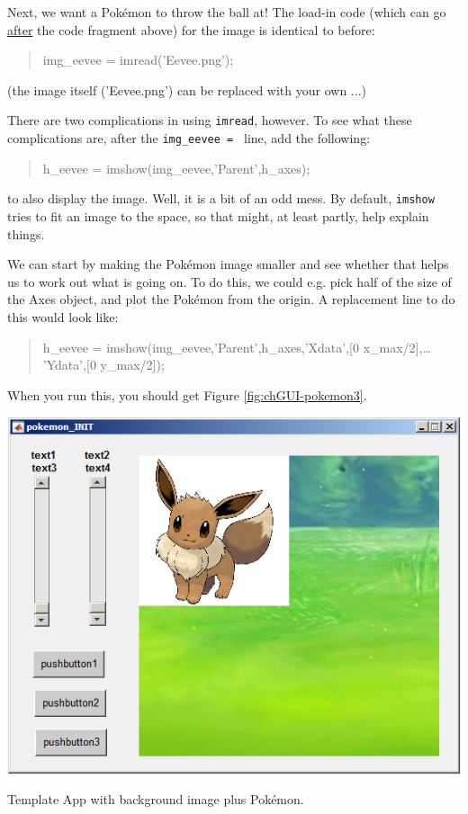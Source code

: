 \documentclass{tufte-book} %
\newenvironment{docspec}{\begin{quotation}\ttfamily\parskip0pt\parindent0pt\ignorespaces}{\end{quotation}}
\begin{document}
Next, we want a Pok\'emon to throw the ball at! The load-in code (which can go \uline{after} the code fragment above) for the image is identical to before:
\begin{docspec}
img\_eevee = imread(\textcolor[rgb]{0.501961,0,1}{'Eevee.png'});
\end{docspec}
(the image itself ('\textsf{Eevee.png}') can be replaced with your own ...) 

There are two complications in using \texttt{imread}, however. To see what these complications are, after the \texttt{img\_eevee = } line, add the following:
\begin{docspec}
h\_eevee = imshow(img\_eevee,\textcolor[rgb]{0.501961,0,1}{'Parent'},h\_axes);
\end{docspec}
to also display the image. Well, it is a bit of an odd mess. By default, \texttt{imshow} tries to fit an image to the space, so that might, at least partly, help explain things.

We can start by making the Pok\'emon image smaller and see whether that helps us to work out what is going on. To do this, we could e.g. pick half of the size of the \textsf{Axes} object, and plot the Pok\'emon from the origin. A replacement line to do this would look like: 
\begin{docspec}
h\_eevee = imshow(img\_eevee,\textcolor[rgb]{0.501961,0,1}{'Parent'},h\_axes,\textcolor[rgb]{0.501961,0,1}{'Xdata'},[0 x\_max/2],\ldots
\\\textcolor[rgb]{0.501961,0,1}{'Ydata'},[0 y\_max/2]);
\end{docspec}
When you run this, you should get Figure \ref{fig:chGUI-pokemon3}. 

\begin{marginfigure}[0.0in]
\includegraphics[width=\linewidth]{chGUI-pokemon3.png}
\caption{Template App with background image plus Pok\'emon.}
\label{fig:chGUI-pokemon3}
\end{marginfigure}
\end{document}
